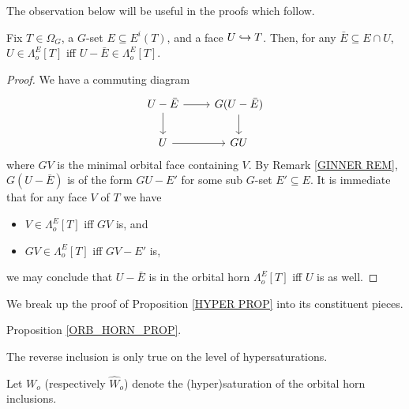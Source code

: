 \documentclass[a4paper,10pt,draft]{article}%
\begin{document}
The observation below will be useful in the proofs which follow.
\begin{lemma}
      \label{FOF_OHORN_LEM}
      Fix $T \in \Omega_G$, a $G$-set $E \subseteq E^i(T)$, and a face $U \hookrightarrow T$.
      Then, for any $\bar E \subseteq E \cap U$,
      $U \in \Lambda^{E}_o[T]$ iff $U - \bar E \in \Lambda^{E}_o[T]$. 
\end{lemma}
\begin{proof}
      We have a commuting diagram
      \begin{equation}
            \begin{tikzcd}
                  U - \bar E \arrow[r] \arrow[d]
                  &
                  G (U - \bar E) \arrow[d]
                  \\
                  U\arrow[r]
                  &
                  G U
            \end{tikzcd}
      \end{equation}
      where $G V$ is the minimal orbital face containing $V$.
      By Remark \ref{GINNER REM}, $G(U - \bar E)$ is of the form $GU - E'$
      for some sub $G$-set $E' \subseteq E$.
      It is immediate that for any face $V$ of $T$ we have
      \begin{itemize}
      \item $V \in \Lambda^{E}_o[T]$ iff $G V$ is, and
      \item $G V \in \Lambda^{E}_o[T]$ iff $G V - E'$ is,
      \end{itemize}
      we may conclude that
      $U - \bar E$ is in the orbital horn $\Lambda^{E}_o[T]$
      iff
      $U$ is as well.
\end{proof}

We break up the proof of Proposition \ref{HYPER PROP} into its constituent pieces.

\begin{proposition}
      Proposition \ref{ORB_HORN_PROP}.
\end{proposition}

The reverse inclusion is only true on the level of hypersaturations.

\begin{definition}
      Let $W_o$ (respectively $\hat{W}_o$) denote the (hyper)saturation of the orbital horn inclusions.
\end{definition}
\end{document}
